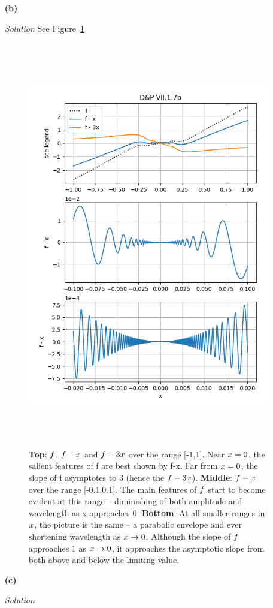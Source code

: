 \documentclass[11pt]{article}
\begin{document}
\begin{itemize}
\item[\textbf{(b)}]
\item[\emph{Solution}] See Figure~\ref{fig:7b}
  \begin{figure}[h]
    \centerline{\includegraphics[height=7in]{figs/Ex.VII.1.7b.png}}
    \caption{\textbf{Top}: $\protect f$, $\protect f-x$ and $\protect f-3x$ over
      the range [-1,1].  Near $\protect x=0$, the salient features of f are best
      shown by f-x.  Far from $\protect x=0$, the slope of f asymptotes to 3
      (hence the $\protect f-3x$).  \textbf{Middle}: $\protect f-x$ over the
      range [-0.1,0.1].  The main features of $\protect f$ start to become
      evident at this range -- diminishing of both amplitude and wavelength as x
      approaches 0. \textbf{Bottom}: At all smaller ranges in $\protect x$, the
      picture is the same -- a parabolic envelope and ever shortening wavelength
      as $\protect x \rightarrow 0$.  Although the slope of $\protect f$
      approaches 1 as $\protect x \rightarrow 0$, it approaches the asymptotic
      slope from both above and below the limiting value. }
    \label{fig:7b}
  \end{figure}


\item[\textbf{(c)}]
\item[\emph{Solution}]
  
\end{itemize}
\end{document}
